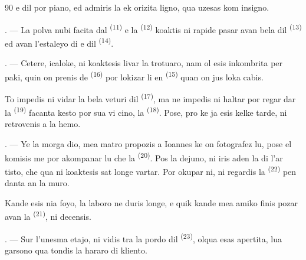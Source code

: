 \begin{VUpage}[92]{90}
\VUcontinue
{} e dil  por piano, ed admiris la\nl
{} ek orizita ligno, qua uzesas kom insigno.

. --- La polva nubi facita dal  \textsuperscript{(11)} e\nl
la  \textsuperscript{(12)} koaktis ni rapide pasar\nl
avan bela  dil  \textsuperscript{(13)} ed\nl
avan l'estaleyo di  e  dil \nl
{} \textsuperscript{(14)}.

. --- Cetere, icaloke, ni koaktesis livar la\nl
trotuaro, nam ol esis inkombrita per paki,\nl
quin on prenis de  \textsuperscript{(16)} por\nl
lokizar li en  \textsuperscript{(15)} quan on jus loka\cc
cabis.

\VUblancAlinea
To impedis ni vidar la bela veturi dil \cc
{} \textsuperscript{(17)}, ma ne impedis ni haltar por regar\cc
dar la  \textsuperscript{(19)} facanta kesto por sua vi\cc
cino, la  \textsuperscript{(18)}.\nl
Pose, pro ke ja esis kelke tarde, ni retrovenis\nl
a la hemo.

\VUsaut{3.0mm}

. --- Ye la morga dio, mea matro propozis\nl
a Ioannes ke on fotografez lu, pose el komisis\nl
me por akompanar lu che la  \textsuperscript{(20)}.\nl
Pos la dejuno, ni iris aden la  di l'ar\cc
tisto, che qua ni koaktesis sat longe vartar.\nl
Por okupar ni, ni regardis la  \textsuperscript{(22)} pen\cc
danta an la muro.

\VUblancAlinea
Kande esis nia foyo, la laboro ne duris longe,\nl
e quik kande mea amiko finis pozar avan la\nl
{} \textsuperscript{(21)}, ni decensis.

. --- Sur l'unesma etajo, ni vidis tra la\nl
pordo dil  \textsuperscript{(23)}, olqua esas apertita, lua\nl
garsono qua tondis la hararo di kliento.
\end{VUpage}

